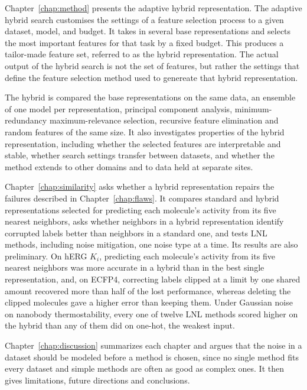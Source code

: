 Chapter~\ref{chap:method} presents the adaptive hybrid representation. The adaptive hybrid search customises the settings of a feature selection process to a given dataset, model, and budget. It takes in several base representations and selects the most important features for that task by a fixed budget. This produces a tailor-made feature set, referred to as the hybrid representation. The actual output of the hybrid search is not the set of features, but rather the settings that define the feature selection method used to genereate that hybrid representation. 

The hybrid is compared the base representations on the same data, an ensemble of one model per representation, principal component analysis, minimum-redundancy maximum-relevance selection, recursive feature elimination and random features of the same size. It also investigates properties of the hybrid representation, including whether the selected features are interpretable and stable, whether search settings transfer between datasets, and whether the method extends to other domains and to data held at separate sites. 

Chapter~\ref{chap:similarity} asks whether a hybrid representation repairs the failures described in Chapter~\ref{chap:flaws}. It compares standard and hybrid representations selected for predicting each molecule's activity from its five nearest neighbors, asks whether neighbors in a hybrid representation identify corrupted labels better than neighbors in a standard one, and tests LNL methods, including noise mitigation, one noise type at a time. Its results are also preliminary. On hERG $K_i$, predicting each molecule's activity from its five nearest neighbors was more accurate in a hybrid than in the best single representation, and, on ECFP4, correcting labels clipped at a limit by one shared amount recovered more than half of the lost performance, whereas deleting the clipped molecules gave a higher error than keeping them. Under Gaussian noise on nanobody thermostability, every one of twelve LNL methods scored higher on the hybrid than any of them did on one-hot, the weakest input.

Chapter~\ref{chap:discussion} summarizes each chapter and argues that the noise in a dataset should be modeled before a method is chosen, since no single method fits every dataset and simple methods are often as good as complex ones. It then gives limitations, future directions and conclusions.

